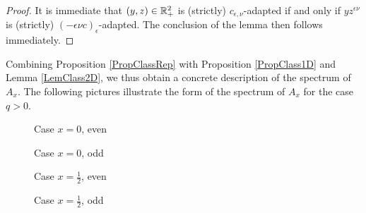 \begin{proof} It is immediate that $(y,z)\in \mathbb{R}_+^2$ is (strictly) $c_{\epsilon,\nu}$-adapted if and only if $yz^{\epsilon\nu}$ is (strictly) $(-\epsilon\nu c)_{\epsilon}$-adapted. The conclusion of the lemma then follows immediately.
\end{proof}

Combining Proposition \ref{PropClassRep} with Proposition \ref{PropClass1D} and Lemma \ref{LemClass2D}, we thus obtain a concrete description of the spectrum of $A_x$. The following pictures illustrate the form of the spectrum of $A_x$ for the case $q>0$.

\begin{figure}[h]
  \centering

  \caption{Case $x=0$, even}
\label{figy}
\end{figure}

\begin{figure}[h]
  \centering

  \caption{Case $x=0$, odd}
\label{figy}
\end{figure}


\begin{figure}[h]
  \centering

  \caption{Case $x=\frac{1}{2}$, even}
\label{figy}
\end{figure}


\begin{figure}[h]
  \centering
  
  
  \caption{Case $x=\frac{1}{2}$, odd}
\label{figy}
\end{figure}

%










